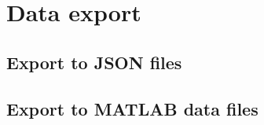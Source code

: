 \chapter{Data export}
\label{ch:DataExport}


\section{Export to JSON files}


\section{Export to MATLAB data files}
